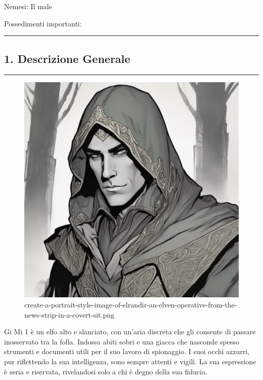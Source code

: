 Nemesi: Il male

Possedimenti importanti:

\begin{center}\rule{0.5\linewidth}{0.5pt}\end{center}

\subsection{1. Descrizione Generale}\label{descrizione-generale}

\begin{center}\rule{0.5\linewidth}{0.5pt}\end{center}

\begin{figure}
\centering
\includegraphics{create-a-portrait-style-image-of-elrandir-an-elven-operative-from-the-news-strip-in-a-covert-sit.png}
\caption{create-a-portrait-style-image-of-elrandir-an-elven-operative-from-the-news-strip-in-a-covert-sit.png}
\end{figure}

Gi Mi 1 è un elfo alto e slanciato, con un'aria discreta che gli
consente di passare inosservato tra la folla. Indossa abiti sobri e una
giacca che nasconde spesso strumenti e documenti utili per il suo lavoro
di spionaggio. I suoi occhi azzurri, pur riflettendo la sua
intelligenza, sono sempre attenti e vigili. La sua espressione è seria e
riservata, rivelandosi solo a chi è degno della sua fiducia.

